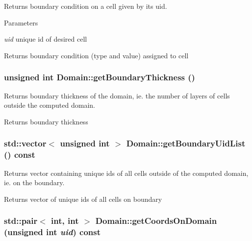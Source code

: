 Returns boundary condition on a cell given by its uid. 
\begin{DoxyParams}{Parameters}
\item[{\em uid}]unique id of desired cell\end{DoxyParams}
\begin{DoxyReturn}{Returns}
boundary condition (type and value) assigned to cell 
\end{DoxyReturn}
\hypertarget{classDomain_aa0d225e23c6a454058a3df5b7b5973fa}{
\subsubsection[{getBoundaryThickness}]{\setlength{\rightskip}{0pt plus 5cm}unsigned int Domain::getBoundaryThickness ()}}
\label{classDomain_aa0d225e23c6a454058a3df5b7b5973fa}


Returns boundary thickness of the domain, ie. the number of layers of cells outside the computed domain. \begin{DoxyReturn}{Returns}
boundary thickness 
\end{DoxyReturn}
\hypertarget{classDomain_a4d0296a4bb86c28b9896951cd1ada6e9}{
\subsubsection[{getBoundaryUidList}]{\setlength{\rightskip}{0pt plus 5cm}std::vector$<$ unsigned int $>$ Domain::getBoundaryUidList () const}}
\label{classDomain_a4d0296a4bb86c28b9896951cd1ada6e9}


Returns vector containing unique ids of all cells outside of the computed domain, ie. on the boundary. \begin{DoxyReturn}{Returns}
vector of unique ids of all cells on boundary 
\end{DoxyReturn}
\hypertarget{classDomain_a792c1fd5763b5a5d9c32d085500671fb}{
\subsubsection[{getCoordsOnDomain}]{\setlength{\rightskip}{0pt plus 5cm}std::pair$<$ int, int $>$ Domain::getCoordsOnDomain (unsigned int {\em uid}) const}}
\label{classDomain_a792c1fd5763b5a5d9c32d085500671fb}


